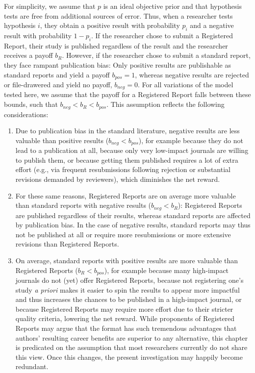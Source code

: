 \documentclass[
  ,man,mask,floatsintext]{apa6}
\providecommand{\tightlist}{%
  \setlength{\itemsep}{0pt}\setlength{\parskip}{0pt}}
\begin{document}
For simplicity, we assume that \(p\) is an ideal objective prior and that hypothesis tests are free from additional sources of error.
Thus, when a researcher tests hypothesis \(i\), they obtain a positive result with probability \(p_i\) and a negative result with probability \(1-p_i\).
If the researcher chose to submit a Registered Report, their study is published regardless of the result and the researcher receives a payoff \(b_{R}\).
However, if the researcher chose to submit a standard report, they face rampant publication bias:
Only positive results are publishable as standard reports and yield a payoff \(b_{pos} = 1\), whereas negative results are rejected or file-drawered and yield no payoff, \(b_{neg} = 0\).
For all variations of the model tested here, we assume that the payoff for a Registered Report falls between these bounds, such that \(b_{neg} < b_{R} < b_{pos}\).
This assumption reflects the following considerations:

\begin{enumerate}
\def\labelenumi{\arabic{enumi}.}
\tightlist
\item
  Due to publication bias in the standard literature, negative results are less valuable than positive results (\(b_{neg} < b_{pos}\)), for example because they do not lead to a publication at all, because only very low-impact journals are willing to publish them, or because getting them published requires a lot of extra effort (e.g., via frequent resubmissions following rejection or substantial revisions demanded by reviewers), which diminishes the net reward.
\item
  For these same reasons, Registered Reports are on average more valuable than standard reports with negative results (\(b_{neg} < b_{R}\)): Registered Reports are published regardless of their results, whereas standard reports are affected by publication bias.
  In the case of negative results, standard reports may thus not be published at all or require more resubmissions or more extensive revisions than Registered Reports.
\item
  On average, standard reports with positive results are more valuable than Registered Reports (\(b_{R} < b_{pos}\)), for example because many high-impact journals do not (yet) offer Registered Reports, because not registering one's study \emph{a priori} makes it easier to spin the results to appear more impactful and thus increases the chances to be published in a high-impact journal, or because Registered Reports may require more effort due to their stricter quality criteria, lowering the net reward.
  While proponents of Registered Reports may argue that the format has such tremendous advantages that authors' resulting career benefits are superior to any alternative, this chapter is predicated on the assumption that most researchers currently do not share this view.
  Once this changes, the present investigation may happily become redundant.
\end{enumerate}
\end{document}
